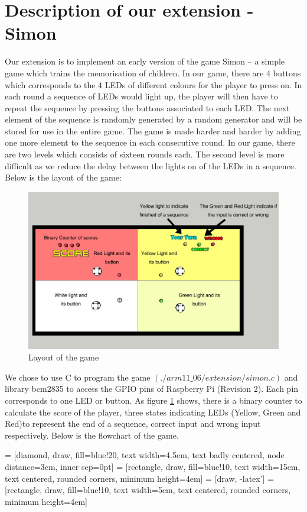 \documentclass[11pt]{article}
\begin{document}
\section{Description of our extension - Simon}
Our extension is to implement an early version of the game Simon -- a simple game which trains the memorisation of children. In our game, there are 4 buttons which corresponds to the 4 LEDs of different colours for the player to press on. In each round a sequence of LEDs would light up, the player will then have to repeat the sequence by pressing the buttons associated to each LED. The next element of the sequence is randomly generated by a random generator and will be stored for use in the entire game. The game is made harder and harder by adding one more element to the sequence in each consecutive round. In our game, there are two levels which consists of sixteen rounds each. The second level is more difficult as we reduce the delay between the lights on of the LEDs in a sequence. Below is the layout of the game:
\begin{figure}[h!]
\centering
\includegraphics[width = 0.75\linewidth]{TOP1.jpg}
\caption{Layout of the game}
\label{fig::layout}
\end{figure}

We chose to use C to program the game $(./arm11{\_}06/extension/simon.c)$ and library bcm2835 to access the GPIO pins of Raspberry Pi (Revision 2). Each pin corresponds to one LED or button. As figure \ref{fig::layout} shows, there is a binary counter to calculate the score of the player, three states indicating LEDs (Yellow, Green and Red)to represent the end of a sequence, correct input and wrong input respectively. Below is the flowchart of the game.

 = [diamond, draw, fill=blue!20,
   text width=4.5em, text badly centered, node distance=3cm, inner sep=0pt]
 = [rectangle, draw, fill=blue!10,
   text width=15em, text centered, rounded corners, minimum height=4em]
 = [draw, -latex']
 = [rectangle, draw, fill=blue!10,
   text width=5em, text centered, rounded corners, minimum height=4em]
 
\end{document}

